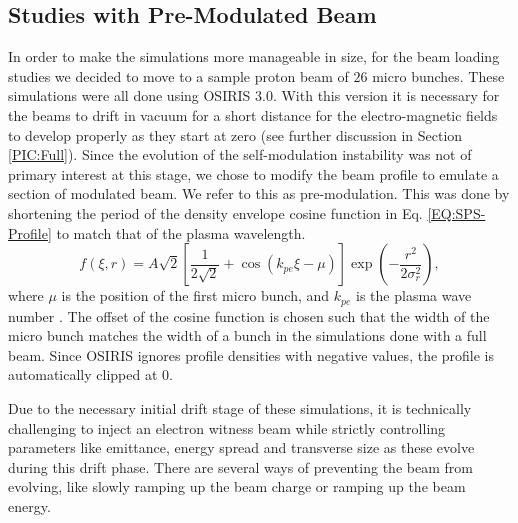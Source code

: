 

\subsection{Studies with Pre-Modulated Beam}
\label{Sim:PBPreMod}

In order to make the simulations more manageable in size, for the beam loading studies we decided to move to a sample proton beam of $26$ micro bunches. These simulations were all done using OSIRIS 3.0. With this version it is necessary for the beams to drift in vacuum for a short distance for the electro-magnetic fields to develop properly as they start at zero (see further discussion in Section \ref{PIC:Full}). Since the evolution of the self-modulation instability was not of primary interest at this stage, we chose to modify the beam profile to emulate a section of modulated beam. We refer to this as pre-modulation. This was done by shortening the period of the density envelope cosine function in Eq. \ref{EQ:SPS-Profile} to match that of the plasma wavelength.
\begin{equation}
    f(\xi,r) = A\sqrt{2} \left[\frac{1}{2\sqrt{2}} + \cos\left(k_{pe}\xi - \mu\right)\right] \exp\left(-\frac{r^{2}}{2\sigma_{r}^{2}}\right), \label{EQ:PB-PreMod}
\end{equation}
where $\mu$ is the position of the first micro bunch, and $k_{pe}$ is the plasma wave number \cite{berglyd_olsen:2015}. The offset of the cosine function is chosen such that the width of the micro bunch matches the width of a bunch in the simulations done with a full beam. Since OSIRIS ignores profile densities with negative values, the profile is automatically clipped at $0$.


Due to the necessary initial drift stage of these simulations, it is technically challenging to inject an electron witness beam while strictly controlling parameters like emittance, energy spread and transverse size as these evolve during this drift phase. There are several ways of preventing the beam from evolving, like slowly ramping up the beam charge or ramping up the beam energy. 


